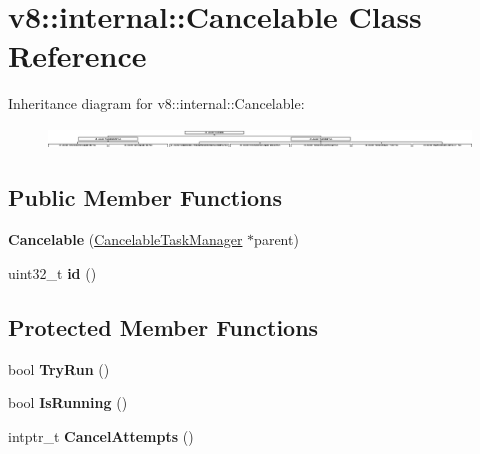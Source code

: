 \hypertarget{classv8_1_1internal_1_1_cancelable}{}\section{v8\+:\+:internal\+:\+:Cancelable Class Reference}
\label{classv8_1_1internal_1_1_cancelable}
Inheritance diagram for v8\+:\+:internal\+:\+:Cancelable\+:\begin{figure}[H]
\begin{center}
\leavevmode
\includegraphics[height=0.570071cm]{classv8_1_1internal_1_1_cancelable}
\end{center}
\end{figure}
\subsection*{Public Member Functions}
\begin{DoxyCompactItemize}
\item 
{\bfseries Cancelable} (\hyperlink{classv8_1_1internal_1_1_cancelable_task_manager}{Cancelable\+Task\+Manager} $\ast$parent)\hypertarget{classv8_1_1internal_1_1_cancelable_af72d1fe8c54b45da487af831987f4e5b}{}\label{classv8_1_1internal_1_1_cancelable_af72d1fe8c54b45da487af831987f4e5b}

\item 
uint32\+\_\+t {\bfseries id} ()\hypertarget{classv8_1_1internal_1_1_cancelable_ae358f3ab842da41d93dd97352705d7db}{}\label{classv8_1_1internal_1_1_cancelable_ae358f3ab842da41d93dd97352705d7db}

\end{DoxyCompactItemize}
\subsection*{Protected Member Functions}
\begin{DoxyCompactItemize}
\item 
bool {\bfseries Try\+Run} ()\hypertarget{classv8_1_1internal_1_1_cancelable_a81a8994f9d4a8803776965c2493f0c25}{}\label{classv8_1_1internal_1_1_cancelable_a81a8994f9d4a8803776965c2493f0c25}

\item 
bool {\bfseries Is\+Running} ()\hypertarget{classv8_1_1internal_1_1_cancelable_a7ce215f652be11182961c4b75be1d299}{}\label{classv8_1_1internal_1_1_cancelable_a7ce215f652be11182961c4b75be1d299}

\item 
intptr\+\_\+t {\bfseries Cancel\+Attempts} ()\hypertarget{classv8_1_1internal_1_1_cancelable_aaba076cd837f38c272da84262377d957}{}\label{classv8_1_1internal_1_1_cancelable_aaba076cd837f38c272da84262377d957}

\end{DoxyCompactItemize}
